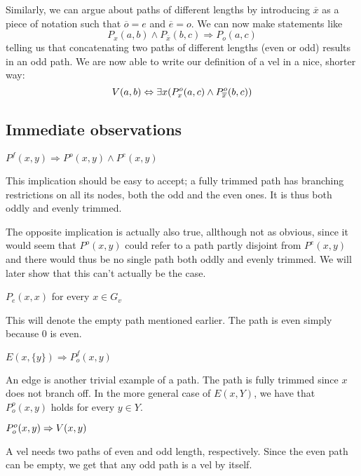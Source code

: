 Similarly, we can argue about paths of different lengths by introducing $\overline{x}$ as a piece of notation such that $\overline{o} = e$ and $\overline{e} = o$.
We can now make statements like \[P_x(a,b) \wedge P_{\overline{x}}(b,c) \Rightarrow P_o(a,c)\] telling us that concatenating two paths of different lengths (even or odd) results in an odd path.
We are now able to write our definition of a vel in a nice, shorter way:
\[
V(a,b) \Leftrightarrow \exists x(P^o_x(a,c) \wedge P^o_{\overline{x}}(b,c))
\]
\subsection{Immediate observations}
\label{sub:Immediate observations}
\begin{lemma}
  $P^f(x,y) \Rightarrow P^o(x,y) \wedge P^e(x,y)$
\end{lemma}
 This implication should be easy to accept; a fully trimmed path has branching restrictions on all its nodes, both the odd and the even ones.
 It is thus both oddly and evenly trimmed.

 The opposite implication is actually also true, allthough not as obvious, since it would seem that $P^o(x,y)$ could refer to a path partly disjoint from $P^e(x,y)$ and there would thus be no single path both oddly and evenly trimmed.
 We will later show that this can't actually be the case.
\begin{lemma}
  $P_e(x,x)$ for every $x \in G_v$
\end{lemma}
This will denote the empty path mentioned earlier.  The path is even simply because 0 is even.
\begin{lemma}
  $E(x,\{ y \}) \Rightarrow P^f_o(x,y)$
\end{lemma}
An edge is another trivial example of a path.
The path is fully trimmed since $x$ does not branch off.
In the more general case of $E(x,Y)$, we have that $P^o_o(x,y)$ holds for every $y \in Y$.
\begin{lemma}
  $P^o_o(x,y) \Rightarrow V(x,y)$
\end{lemma}
A vel needs two paths of even and odd length, respectively.
Since the even path can be empty, we get that any odd path is a vel by itself.
